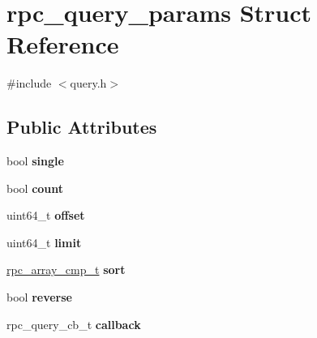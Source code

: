 \hypertarget{structrpc__query__params}{}\section{rpc\+\_\+query\+\_\+params Struct Reference}
\label{structrpc__query__params}


{\ttfamily \#include $<$query.\+h$>$}

\subsection*{Public Attributes}
\begin{DoxyCompactItemize}
\item 
bool {\bfseries single}\hypertarget{structrpc__query__params_a6e4eafac062b7f7490a4983d56296385}{}\label{structrpc__query__params_a6e4eafac062b7f7490a4983d56296385}

\item 
bool {\bfseries count}\hypertarget{structrpc__query__params_a7b488114aeb262c508dd28acc1a7fc95}{}\label{structrpc__query__params_a7b488114aeb262c508dd28acc1a7fc95}

\item 
uint64\+\_\+t {\bfseries offset}\hypertarget{structrpc__query__params_a4e33edf4295472adcc84d6d1ccee2ddd}{}\label{structrpc__query__params_a4e33edf4295472adcc84d6d1ccee2ddd}

\item 
uint64\+\_\+t {\bfseries limit}\hypertarget{structrpc__query__params_a89ee7bc896675c8c2ef148436430ba0a}{}\label{structrpc__query__params_a89ee7bc896675c8c2ef148436430ba0a}

\item 
\hyperlink{object_8h_a37160a10fb9baee827063f3db977315d}{rpc\+\_\+array\+\_\+cmp\+\_\+t} {\bfseries sort}\hypertarget{structrpc__query__params_a661d864b8637b469fd99f3b7392aa507}{}\label{structrpc__query__params_a661d864b8637b469fd99f3b7392aa507}

\item 
bool {\bfseries reverse}\hypertarget{structrpc__query__params_ad50d1e6e25322f5562ec1793647c1618}{}\label{structrpc__query__params_ad50d1e6e25322f5562ec1793647c1618}

\item 
rpc\+\_\+query\+\_\+cb\+\_\+t {\bfseries callback}\hypertarget{structrpc__query__params_ab8b50541840d07c084797048d22d589a}{}\label{structrpc__query__params_ab8b50541840d07c084797048d22d589a}

\end{DoxyCompactItemize}


